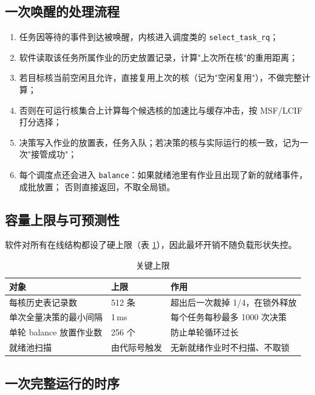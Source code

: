 \documentclass[11pt,a4paper]{article}
\newcommand{\code}[1]{\texttt{#1}}
\begin{document}
\subsection{一次唤醒的处理流程}

\begin{enumerate}
  \item 任务因等待的事件到达被唤醒，内核进入调度类的 \code{select\_task\_rq}；
  \item 软件读取该任务所属作业的历史放置记录，计算"上次所在核"的重用距离；
  \item 若目标核当前空闲且允许，直接复用上次的核（记为"空闲复用"），不做完整计算；
  \item 否则在可运行核集合上计算每个候选核的加速比与缓存冲击，按 MSF/LCIF 打分选择；
  \item 决策写入作业的放置表，任务入队；若决策的核与实际运行的核一致，记为一次"接管成功"；
  \item 每个调度点还会进入 \code{balance}：如果就绪池里有作业且出现了新的就绪事件，成批放置；
        否则直接返回，不取全局锁。
\end{enumerate}

\subsection{容量上限与可预测性}

软件对所有在线结构都设了硬上限（表 \ref{tab:limits}），因此最坏开销不随负载形状失控。

\begin{table}[H]
\centering
\caption{关键上限}
\label{tab:limits}
\small
\begin{tabular}{@{}p{4.8cm}p{3.0cm}p{7.6cm}@{}}
\toprule
对象 & 上限 & 作用 \\
\midrule
每核历史表记录数 & 512 条 & 超出后一次裁掉 1/4，在锁外释放 \\
单次全量决策的最小间隔 & 1\,ms & 每个任务每秒最多 1000 次决策 \\
单轮 balance 放置作业数 & 256 个 & 防止单轮循环过长 \\
就绪池扫描 & 由代际号触发 & 无新就绪作业时不扫描、不取锁 \\
\bottomrule
\end{tabular}
\end{table}

\subsection{一次完整运行的时序}
\end{document}
